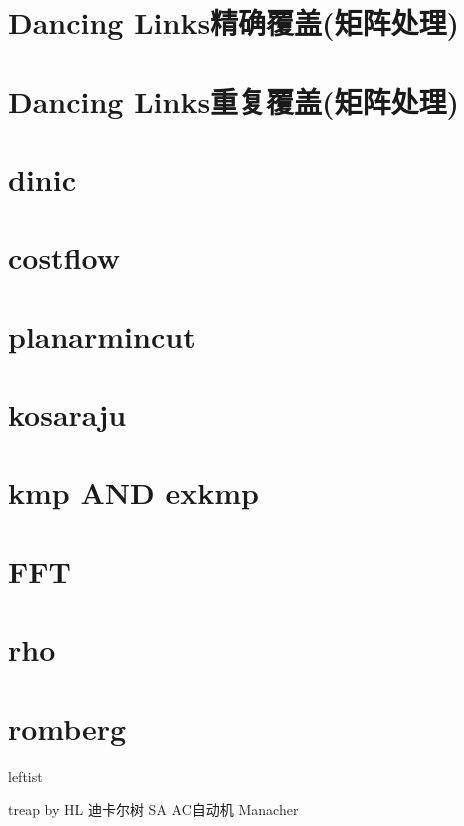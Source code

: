 \documentclass[
	10pt,
	twocolumn,
	a4paper,
]{article}
\begin{document}
\section{Dancing Links精确覆盖(矩阵处理)}

\section{Dancing Links重复覆盖(矩阵处理)}

\section{dinic}

\section{costflow}

\section{planarmincut}

\section{kosaraju}

\section{kmp AND exkmp}

\section{FFT}

\section{rho}

\section{romberg}



leftist

treap by HL
迪卡尔树
SA
AC自动机
Manacher
\end{document}
